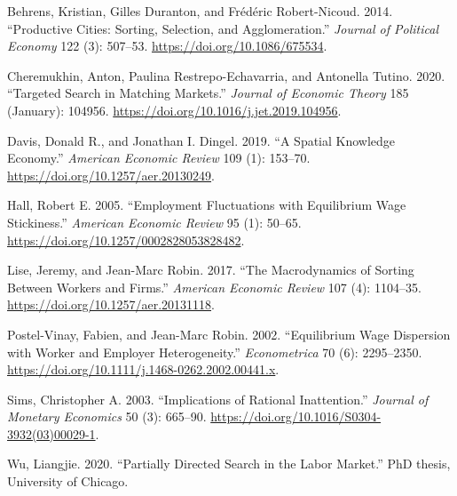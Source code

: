 \documentclass[
  letterpaper,
  DIV=11,
  numbers=noendperiod]{scrreprt}
\newlength{\cslhangindent}
\newlength{\cslentryspacingunit} %
\newenvironment{CSLReferences}[2] %
 {%
  \setlength{\parindent}{0pt}
  \ifodd #1
  \let\oldpar\par
  \def\par{\hangindent=\cslhangindent\oldpar}
  \fi
  \setlength{\parskip}{#2\cslentryspacingunit}
 }%
 {}
\begin{document}
\hypertarget{refs}{}
\begin{CSLReferences}{1}{0}
\leavevmode{}%
Behrens, Kristian, Gilles Duranton, and Frédéric Robert-Nicoud. 2014.
{``Productive {Cities}: {Sorting}, {Selection}, and {Agglomeration}.''}
\emph{Journal of Political Economy} 122 (3): 507--53.
\url{https://doi.org/10.1086/675534}.

\leavevmode{}%
Cheremukhin, Anton, Paulina Restrepo-Echavarria, and Antonella Tutino.
2020. {``Targeted Search in Matching Markets.''} \emph{Journal of
Economic Theory} 185 (January): 104956.
\url{https://doi.org/10.1016/j.jet.2019.104956}.

\leavevmode{}%
Davis, Donald R., and Jonathan I. Dingel. 2019. {``A {Spatial Knowledge
Economy}.''} \emph{American Economic Review} 109 (1): 153--70.
\url{https://doi.org/10.1257/aer.20130249}.

\leavevmode{}%
Hall, Robert E. 2005. {``Employment {Fluctuations} with {Equilibrium
Wage Stickiness}.''} \emph{American Economic Review} 95 (1): 50--65.
\url{https://doi.org/10.1257/0002828053828482}.

\leavevmode{}%
Lise, Jeremy, and Jean-Marc Robin. 2017. {``The {Macrodynamics} of
{Sorting} Between {Workers} and {Firms}.''} \emph{American Economic
Review} 107 (4): 1104--35. \url{https://doi.org/10.1257/aer.20131118}.

\leavevmode{}%
Postel-Vinay, Fabien, and Jean-Marc Robin. 2002. {``Equilibrium {Wage
Dispersion} with {Worker} and {Employer Heterogeneity}.''}
\emph{Econometrica} 70 (6): 2295--2350.
\url{https://doi.org/10.1111/j.1468-0262.2002.00441.x}.

\leavevmode{}%
Sims, Christopher A. 2003. {``Implications of Rational Inattention.''}
\emph{Journal of Monetary Economics} 50 (3): 665--90.
\url{https://doi.org/10.1016/S0304-3932(03)00029-1}.

\leavevmode{}%
Wu, Liangjie. 2020. {``Partially {Directed Search} in the {Labor
Market}.''} PhD thesis, University of Chicago.

\end{CSLReferences}
\end{document}
